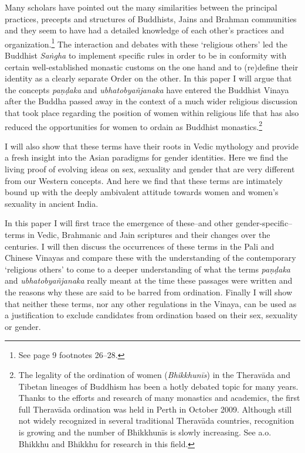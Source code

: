Many scholars have pointed out the many similarities between the principal practices, precepts and structures of Buddhists, Jains and Brahman communities and they seem to have had a detailed knowledge of each other's practices and organization.\footnote{See \cite{maes2016} page 9 footnotes 26–28.} The interaction and debates with these `religious others' led the Buddhist {\em Saṅgha} to implement specific rules in order to be in conformity with certain well-established monastic customs on the one hand and to (re)define their identity as a clearly separate Order on the other. In this paper I will argue that the concepts {\em paṇḍaka} and {\em ubhatob­yañ­janaka} have entered the Buddhist Vinaya after the Buddha passed away in the context of a much wider religious discussion that took place regarding the position of women within religious life that has also reduced the opportunities for women to ordain as Buddhist monastics.\footnote{The legality of the ordination of women ({\em Bhikkhunīs}) in the Theravāda and Tibetan lineages of Buddhism has been a hotly debated topic for many years. Thanks to the efforts and research of many monastics and academics, the first full Theravāda ordination was held in Perth in October 2009. Although still not widely recognized in several traditional Theravāda countries, recognition is growing and the number of Bhikkhunīs is slowly increasing. See a.o. Bhikkhu \cite{sujato2009} and Bhikkhu \cite{analayo2013} for research in this field.} 

I will also show that these terms have their roots in Vedic mythology and provide a fresh insight into the Asian paradigms for gender identities. Here we find the living proof of evolving ideas on sex, sexuality and gender that are very different from our Western concepts. And here we find that these terms are intimately bound up with the deeply ambivalent attitude towards women and women's sexuality in ancient India.

In this paper I will first trace the emergence of these--and other gender-specific--terms in Vedic, Brahmanic and Jain scriptures and their changes over the centuries. I will then discuss the occurrences of these terms in the Pali and Chinese Vinayas and compare these with the understanding of the contemporary `religious others' to come to a deeper understanding of what the terms {\em paṇḍaka} and {\em ubhatob­yañ­janaka} really meant at the time these passages were written and the reasons why these are said to be barred from ordination. Finally I will show that neither these terms, nor any other regulations in the Vinaya, can be used as a justification to exclude candidates from ordination based on their sex, sexuality or gender.